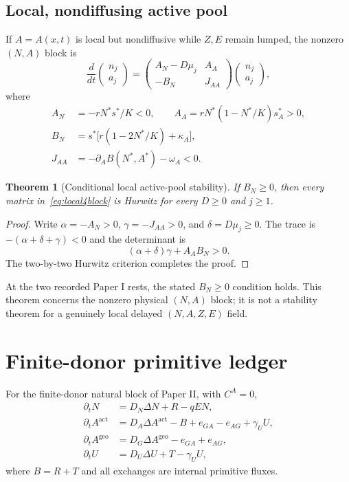 \documentclass[11pt]{article}
\newtheorem{theorem}{Theorem}
\theoremstyle{definition}
\begin{document}
\subsection{Local, nondiffusing active pool}

If $A=A(x,t)$ is local but nondiffusive while $Z,E$ remain lumped, the nonzero $(N,A)$ block is
\begin{equation}
\frac d{dt}\begin{pmatrix}n_j\\a_j\end{pmatrix}
=
\begin{pmatrix}
A_N-D\mu_j&A_A\\
-B_N&J_{AA}
\end{pmatrix}
\begin{pmatrix}n_j\\a_j\end{pmatrix},
\label{eq:local4block}
\end{equation}
where
\begin{align*}
A_N&=-rN^*s^*/K<0,\qquad
A_A=rN^*(1-N^*/K)s_A^*>0,\\
B_N&=s^*\bigl[r(1-2N^*/K)+\kappa_A\bigr],\\
J_{AA}&=-\partial_AB(N^*,A^*)-\omega_A<0.
\end{align*}

\begin{theorem}[Conditional local active-pool stability]
\label{thm:local4}
If $B_N\ge0$, then every matrix in~\eqref{eq:local4block} is Hurwitz for every $D\ge0$ and $j\ge1$.
\end{theorem}

\begin{proof}
Write $\alpha=-A_N>0$, $\gamma=-J_{AA}>0$, and $\delta=D\mu_j\ge0$. The trace is $-(\alpha+\delta+\gamma)<0$ and the determinant is
\[
(\alpha+\delta)\gamma+A_AB_N>0.
\]
The two-by-two Hurwitz criterion completes the proof.\end{proof}

At the two recorded Paper I rests, the stated $B_N\ge0$ condition holds. This theorem concerns the nonzero physical $(N,A)$ block; it is not a stability theorem for a genuinely local delayed $(N,A,Z,E)$ field.

\section{Finite-donor primitive ledger}
\label{sec:donor}

For the finite-donor natural block of Paper II, with $C^A=0$,
\begin{equation}
\begin{aligned}
\partial_tN&=D_N\Delta N+R-qEN,\\
\partial_tA^{\mathrm{act}}&=D_A\Delta A^{\mathrm{act}}-B+e_{GA}-e_{AG}+\gamma_UU,\\
\partial_tA^{\mathrm{geo}}&=D_G\Delta A^{\mathrm{geo}}-e_{GA}+e_{AG},\\
\partial_tU&=D_U\Delta U+T-\gamma_UU,
\end{aligned}
\label{eq:fd}
\end{equation}
where $B=R+T$ and all exchanges are internal primitive fluxes.
\end{document}
